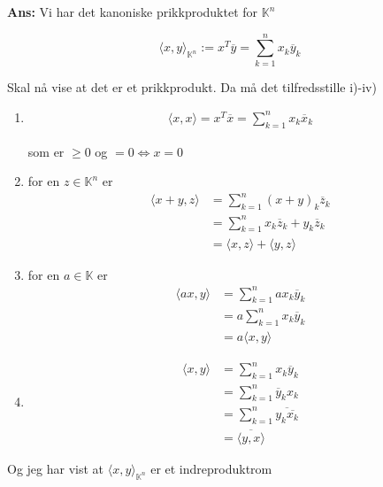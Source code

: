 \documentclass[11pt]{article}
\newenvironment{solbox}
  {\begin{mdframed}[linewidth=1pt,linecolor=black,roundcorner=5pt]
   \noindent\textbf{Ans: }\enspace}
  {\end{mdframed}}
\newcommand{\compconj}[1]{%
  \overline{#1}%
}
\begin{document}
\begin{solbox}
    Vi har det kanoniske prikkproduktet for $ \mathbb{K}^n $ 

    \[
        \langle x, y \rangle _{\mathbb{K}^n} := x^T \compconj{y} = \sum_{ k=1 }^{ n } x_k \compconj{y}_k
    \]

    Skal nå vise at det er et prikkprodukt. Da må det tilfredsstille i)-iv)

    \begin{enumerate}
        \item \begin{align*}
            \langle x, x \rangle = x^T \compconj{x} = \sum_{ k=1 }^{ n } x_k \compconj{x}_k
        \end{align*}
         
        som er $ \geq 0 $ og $ =0 \Longleftrightarrow x=0$  
        \item for en $ z \in \mathbb{K}^n $ er  \begin{align*}
            \langle x+y, z \rangle &= \sum_{ k=1 }^{ n } (x+y)_k \compconj{z}_k \\
            &= \sum_{ k=1 }^{ n } x_k \compconj{z}_k + y_k \compconj{z}_k \\
            &= \langle x, z \rangle + \langle y, z \rangle 
        \end{align*}

        \item for en $ a \in \mathbb{K} $ er \begin{align*}
            \langle ax, y \rangle &= \sum_{ k=1 }^{ n } ax_k \compconj{y}_k \\
            &= a \sum_{ k=1 }^{ n } x_k \compconj{y}_k \\
            &= a \langle x, y \rangle 
        \end{align*}

        \item \begin{align*}
            \langle x, y \rangle &= \sum_{ k=1 }^{ n } x_k \compconj{y}_k \\
            &= \sum_{ k=1 }^{ n } \compconj{y}_k x_k \\
            &= \sum_{ k=1 }^{ n } \overline{ y_k \overline{x_k}}\\
            &= \compconj{\langle y, x \rangle}  
        \end{align*}
        
    \end{enumerate}
    Og jeg har vist at $ \langle x, y \rangle _{\mathbb{K}^n} $ er et indreproduktrom 
\end{solbox}
\end{document}
